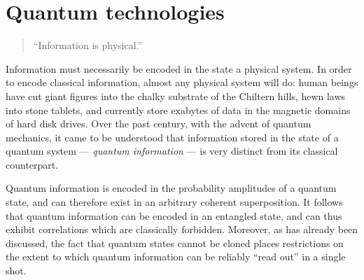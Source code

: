 




\section{Quantum technologies} 
\label{sec:quantum-technologies}
\begin{quote}
``Information is physical.''
\end{quote}
Information must necessarily be encoded in the state a physical system.
In order to encode classical information, almost any physical system will do: human beings have cut giant figures into the chalky substrate of the Chiltern hills, hewn laws into stone tablets, and currently store exabytes of data in the magnetic domains of hard disk drives. Over the past century, with the advent of quantum mechanics, it came to be understood that information stored in the state of a quantum system --- \emph{quantum information} --- is very distinct from its classical counterpart. 

Quantum information is encoded in the probability amplitudes of a quantum state, and can therefore exist in an arbitrary coherent superposition. It follows that quantum information can be encoded in an entangled state, and can thus exhibit correlations which are classically forbidden.  Moreover, as has already been discussed, the fact that quantum states cannot be cloned places restrictions on the extent to which quantum information can be reliably ``read out'' in a single shot. 

